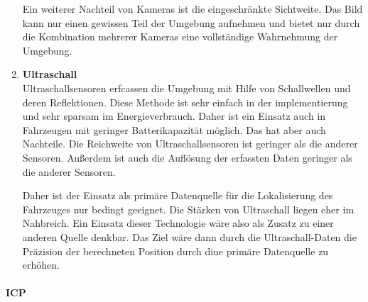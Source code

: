 \begin{enumerate}
    Ein weiterer Nachteil von Kameras ist die eingeschränkte Sichtweite. 
    Das Bild kann nur einen gewissen Teil der Umgebung aufnehmen und bietet nur durch die Kombination mehrerer Kameras eine vollständige Wahrnehmung der Umgebung.


    \item \textbf{Ultraschall}\\
    Ultraschallsensoren erfcassen die Umgebung mit Hilfe von Schallwellen und deren Reflektionen. 
    Diese Methode ist sehr einfach in der implementierung und sehr sparsam im Energieverbrauch. 
    Daher ist ein Einsatz auch in Fahrzeugen mit geringer Batterikapazität möglich.
    Das hat aber auch Nachteile. 
    Die Reichweite von Ultraschallsensoren ist geringer als die anderer Sensoren. 
    Außerdem ist auch die Auflösung der erfassten Daten geringer als die anderer Sensoren.

    Daher ist der Einsatz als primäre Datenquelle für die Lokalisierung des Fahrzeuges nur bedingt geeignet.
    Die Stärken von Ultraschall liegen eher im Nahbreich.
    Ein Einsatz dieser Technologie wäre also als Zusatz zu einer anderen Quelle denkbar. 
    Das Ziel wäre dann durch die Ultraschall-Daten die Präzision der berechneten Position durch diue primäre Datenquelle zu erhöhen. 
\end{enumerate}


\paragraph{ICP}

\newpage
